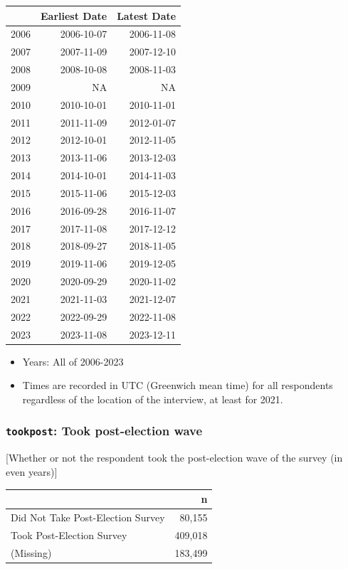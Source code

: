 \documentclass[10pt,article,oneside]{memoir}
\theoremstyle{definition}
\begin{document}
\begin{table}
\centering
\begin{tabular}{lrr}
\toprule
 & Earliest Date & Latest Date\\
\midrule
2006 & 2006-10-07 & 2006-11-08\\
2007 & 2007-11-09 & 2007-12-10\\
2008 & 2008-10-08 & 2008-11-03\\
2009 & NA & NA\\
2010 & 2010-10-01 & 2010-11-01\\
2011 & 2011-11-09 & 2012-01-07\\
2012 & 2012-10-01 & 2012-11-05\\
2013 & 2013-11-06 & 2013-12-03\\
2014 & 2014-10-01 & 2014-11-03\\
2015 & 2015-11-06 & 2015-12-03\\
2016 & 2016-09-28 & 2016-11-07\\
2017 & 2017-11-08 & 2017-12-12\\
2018 & 2018-09-27 & 2018-11-05\\
2019 & 2019-11-06 & 2019-12-05\\
2020 & 2020-09-29 & 2020-11-02\\
2021 & 2021-11-03 & 2021-12-07\\
2022 & 2022-09-29 & 2022-11-08\\
2023 & 2023-11-08 & 2023-12-11\\
\bottomrule
\end{tabular}
\end{table}

\begin{itemize}
\tightlist
\item
  Years: All of 2006-2023
\item
  Times are recorded in UTC (Greenwich mean time) for all respondents
  regardless of the location of the interview, at least for 2021.
\end{itemize}

\subsubsection{\texorpdfstring{\texttt{tookpost}: Took post-election
wave}{tookpost: Took post-election wave}}\label{tookpost-took-post-election-wave}

{[}Whether or not the respondent took the post-election wave of the
survey (in even years){]}

\begin{table}[H]
\centering
\begin{tabular}[t]{lr}
\toprule
 & n\\
\midrule
Did Not Take Post-Election Survey & 80,155\\
Took Post-Election Survey & 409,018\\
(Missing) & 183,499\\
\bottomrule
\end{tabular}
\end{table}
\end{document}
